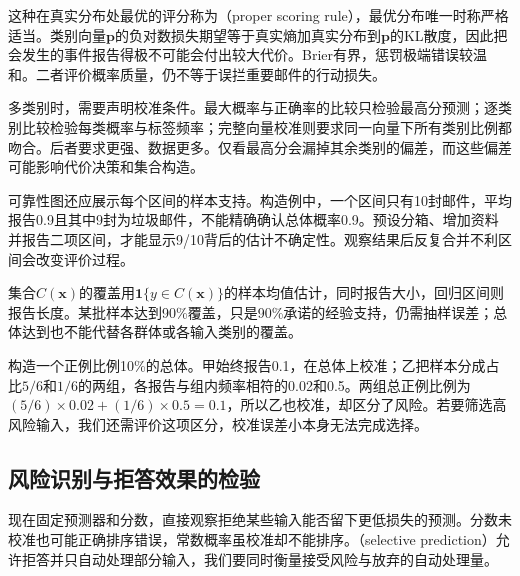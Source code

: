 这种在真实分布处最优的评分称为（proper scoring rule），最优分布唯一时称严格适当。类别向量$\bm p$的负对数损失期望等于真实熵加真实分布到$\bm p$的KL散度，因此把会发生的事件报告得极不可能会付出较大代价。Brier有界，惩罚极端错误较温和。二者评价概率质量，仍不等于误拦重要邮件的行动损失。

多类别时，需要声明校准条件。最大概率与正确率的比较只检验最高分预测；逐类别比较检验每类概率与标签频率；完整向量校准则要求同一向量下所有类别比例都吻合。后者要求更强、数据更多。仅看最高分会漏掉其余类别的偏差，而这些偏差可能影响代价决策和集合构造。

可靠性图还应展示每个区间的样本支持。构造例中，一个区间只有10封邮件，平均报告0.9且其中9封为垃圾邮件，不能精确确认总体概率0.9。预设分箱、增加资料并报告二项区间，才能显示9/10背后的估计不确定性。观察结果后反复合并不利区间会改变评价过程。

集合$C(\bm{x})$的覆盖用$\mathbf 1\{y\in C(\bm{x})\}$的样本均值估计，同时报告大小，回归区间则报告长度。某批样本达到90\%覆盖，只是90\%承诺的经验支持，仍需抽样误差；总体达到也不能代替各群体或各输入类别的覆盖。

\begin{example}[校准与区分能力]
\label{ex:reliability-constant-score}
构造一个正例比例10\%的总体。甲始终报告0.1，在总体上校准；乙把样本分成占比$5/6$和$1/6$的两组，各报告与组内频率相符的0.02和0.5。两组总正例比例为$(5/6)\times0.02+(1/6)\times0.5=0.1$，所以乙也校准，却区分了风险。若要筛选高风险输入，我们还需评价这项区分，校准误差小本身无法完成选择。
\end{example}

\subsection{风险识别与拒答效果的检验}
\label{sec:reliability-selection-evaluation}

现在固定预测器和分数，直接观察拒绝某些输入能否留下更低损失的预测。分数未校准也可能正确排序错误，常数概率虽校准却不能排序。（selective prediction）允许拒答并只自动处理部分输入，我们要同时衡量接受风险与放弃的自动处理量。

